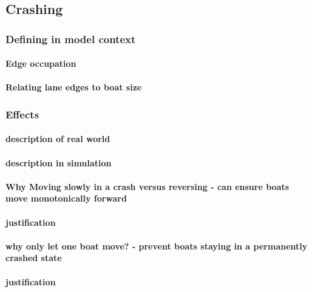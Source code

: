     \subsection{Crashing}
      \subsubsection{Defining in model context}
        \paragraph{Edge occupation}
        \paragraph{Relating lane edges to boat size}
      \subsubsection{Effects}
        \paragraph{description of real world}
        \paragraph{description in simulation}
        \paragraph{Why Moving slowly in a crash versus reversing - can ensure boats move monotonically forward}
        \paragraph{justification}
        \paragraph{why only let one boat move? - prevent boats staying in a permanently crashed state}
        \paragraph{justification}
  

